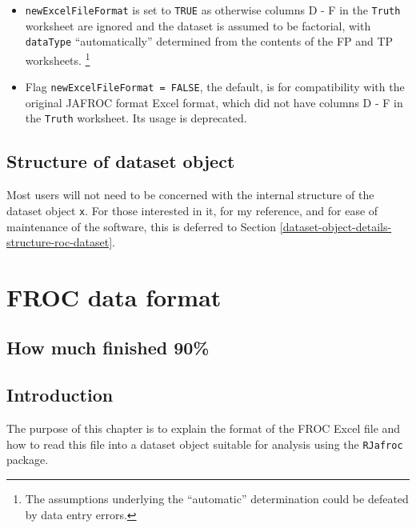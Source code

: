 \documentclass[
]{book}
\begin{document}
\begin{itemize}
\item
  \texttt{newExcelFileFormat} is set to \texttt{TRUE} as otherwise columns D - F in the \texttt{Truth} worksheet are ignored and the dataset is assumed to be factorial, with \texttt{dataType} ``automatically'' determined from the contents of the FP and TP worksheets. \footnote{The assumptions underlying the ``automatic'' determination could be defeated by data entry errors.}
\item
  Flag \texttt{newExcelFileFormat\ =\ FALSE}, the default, is for compatibility with the original JAFROC format Excel format, which did not have columns D - F in the \texttt{Truth} worksheet. Its usage is deprecated.
\end{itemize}

\hypertarget{quick-start-roc-structure-dataset}{%
\section{Structure of dataset object}\label{quick-start-roc-structure-dataset}}

Most users will not need to be concerned with the internal structure of the dataset object \texttt{x}. For those interested in it, for my reference, and for ease of maintenance of the software, this is deferred to Section \ref{dataset-object-details-structure-roc-dataset}.

\hypertarget{quick-start-froc-data-format}{%
\chapter{FROC data format}\label{quick-start-froc-data-format}}

\hypertarget{quick-start-froc-how-much-finished}{%
\section{How much finished 90\%}\label{quick-start-froc-how-much-finished}}

\hypertarget{quick-start-froc-data-intro}{%
\section{Introduction}\label{quick-start-froc-data-intro}}

The purpose of this chapter is to explain the format of the FROC Excel file and how to read this file into a dataset object suitable for analysis using the \texttt{RJafroc} package.
\end{document}
